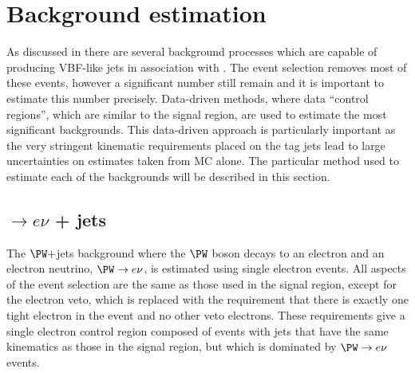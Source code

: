 \section{Background estimation}
\label{sec:promptbkg}
As discussed in  there are several background processes which are capable of producing VBF-like jets in association with \MET. The event selection removes most of these events, however a significant number still remain and it is important to estimate this number precisely. Data-driven methods, where data ``control regions'', which are similar to the signal region, are used to estimate the most significant backgrounds. This data-driven approach is particularly important as the very stringent kinematic requirements placed on the tag jets lead to large uncertainties on estimates taken from \ac{MC} alone. The particular method used to estimate each of the backgrounds will be described in this section.

\subsection{\PW$\rightarrow e\nu$ + jets}
\label{sec:promptwenu}
The $\PW+$jets background where the $\PW$ boson decays to an electron and an electron neutrino, $\PW\rightarrow e\nu$, is estimated using single electron events. All aspects of the event selection are the same as those used in the signal region, except for the electron veto, which is replaced with the requirement that there is exactly one tight electron in the event and no other veto electrons. These requirements give a single electron control region composed of events with jets that have the same kinematics as those in the signal region, but which is dominated by $\PW\rightarrow e\nu$ events.

